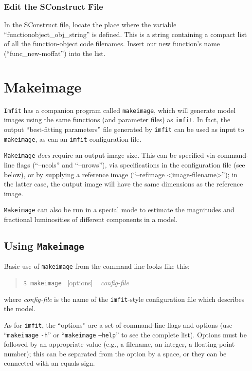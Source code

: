 \documentclass[10pt]{article}
\newcommand{\imfit}{\texttt{imfit}}
\newcommand{\Imfit}{\texttt{Imfit}}
\newcommand{\makeimage}{\texttt{makeimage}}
\newcommand{\Makeimage}{\texttt{Makeimage}}
\begin{document}
\subsubsection{Edit the SConstruct File}

In the SConstruct file, locate the place where the variable
``functionobject\_obj\_string'' is defined. This is a string containing
a compact list of all the function-object code filenames. Insert our new
function's name (``func\_new-moffat'') into the list.



\section{Makeimage}

\Imfit{} has a companion program called \makeimage, which will generate model
images using the same functions (and parameter files) as \imfit. In fact, the
output ``best-fitting parameters'' file generated by \imfit{} can be used as
input to \makeimage, as can an \imfit{} configuration file.

\Makeimage{} \textit{does} require an output image size.  This can be
specified via command-line flags (``--ncols'' and ``--nrows''), via
specifications in the configuration file (see below), or by supplying a
reference image (``--refimage <image-filename>''); in the latter case,
the output image will have the same dimensions as the reference image.

\Makeimage{} can also be run in a special mode to estimate the
magnitudes and fractional luminosities of different components in a
model.


\subsection{Using \Makeimage{}}

Basic use of \makeimage{} from the command line looks like this:
\begin{quote}
  \texttt{\$ \makeimage{} }  [options] ~ \textit{config-file}
\end{quote}
where \textit{config-file} is the name of the \imfit{}-style configuration file
which describes the model.

As for \imfit, the ``options'' are a set of command-line flags and
options (use ``\makeimage{} \texttt{-h}'' or ``\makeimage{} \texttt{--help}'' to
see the complete list). Options must be followed by an appropriate value
(e.g., a filename, an integer, a floating-point number); this can be
separated from the option by a space, or they can be connected with an
equals sign.
\end{document}
